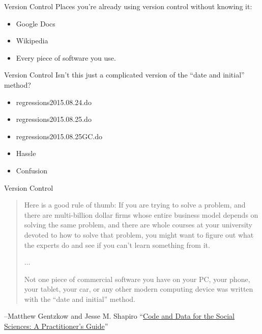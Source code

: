 \documentclass{beamer}
\begin{document}
\begin{frame}{Version Control}
Places you're already using version control without knowing it:
\begin{itemize}
	\item
	Google Docs
	\item
	Wikipedia
	\item
	Every piece of software you use.
\end{itemize}
\end{frame}

\begin{frame}{Version Control}
Isn't this just a complicated version of the ``date and initial'' method?
\begin{itemize}
\item regressions2015.08.24.do
\item regressions2015.08.25.do
\item regressions2015.08.25GC.do
\item Hassle
\item Confusion
\end{itemize}
\end{frame}

\begin{frame}{Version Control}
\begin{quote}Here is a good rule of thumb: If you are trying to solve a problem, and there are multi-billion dollar  firms  whose  entire  business  model  depends  on  solving  the  same  problem,  and  there  are whole courses at your university devoted to how to solve that problem, you might want to figure out what the experts do and see if you can’t learn something from it.

...

Not one piece of commercial software you have on your PC, your phone, your tablet,
your car, or any other modern computing device was written with the “date and initial” method.
\end{quote}
--Matthew Gentzkow and Jesse M. Shapiro ``\href{http://web.stanford.edu/~gentzkow/research/CodeAndData.pdf}{Code and Data for the Social Sciences: A Practitioner's Guide}''
\end{frame}
\end{document}
